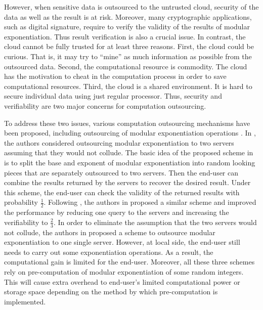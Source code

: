 \documentclass[english,draftcls,onecolumn,11pt]{IEEEtran}
\theoremstyle{definition}
\theoremstyle{plain}
\theoremstyle{plain}
\theoremstyle{definition}
\begin{document}
However, when sensitive data is outsourced to the untrusted cloud,
security of the data as well as the result is at risk. Moreover, many
cryptographic applications, such as digital signature, require to
verify the validity of the results of modular exponentiation. Thus
result verification is also a crucial issue. In contrast, the cloud
cannot be fully trusted for at least three reasons. First, the cloud
could be curious. That is, it may try to ``mine'' as much information
as possible from the outsourced data. Second, the computational resource
is commodity. The cloud has the motivation to cheat in the computation
process in order to save computational resources. Third, the cloud
is a shared environment. It is hard to secure individual data using
just regular processor. Thus, security and verifiability are two major
concerns for computation outsourcing.

To address these two issues, various computation outsourcing mechanisms
have been proposed, including outsourcing of modular exponentiation
operations \cite{atallah2002,atallah2010,atallah2005secure,wang2011infocom,chen2014efficient,blanton2012secure,blanton2010secure,hohenberger2005securely,chen2012new,wang2014securely}.
In \cite{hohenberger2005securely}, the authors considered outsourcing
modular exponentiation to two servers assuming that they would not
collude. The basic idea of the proposed scheme in \cite{hohenberger2005securely}
is to split the base and exponent of modular exponentiation into random
looking pieces that are separately outsourced to two servers. Then
the end-user can combine the results returned by the servers to recover
the desired result. Under this scheme, the end-user can check the
validity of the returned results with probability $\frac{1}{2}$.
Following \cite{hohenberger2005securely}, the authors in \cite{chen2012new}
proposed a similar scheme and improved the performance by reducing
one query to the servers and increasing the verifiability to $\frac{2}{3}$.
In order to eliminate the assumption that the two servers would not
collude, the authors in \cite{wang2014securely} proposed a scheme
to outsource modular exponentiation to one single server. However,
at local side, the end-user still needs to carry out some exponentiation
operations. As a result, the computational gain is limited for the
end-user. Moreover, all these three schemes rely on pre-computation
of modular exponentiation of some random integers. This will cause
extra overhead to end-user's limited computational power or storage
space depending on the method by which pre-computation is implemented.
\end{document}
